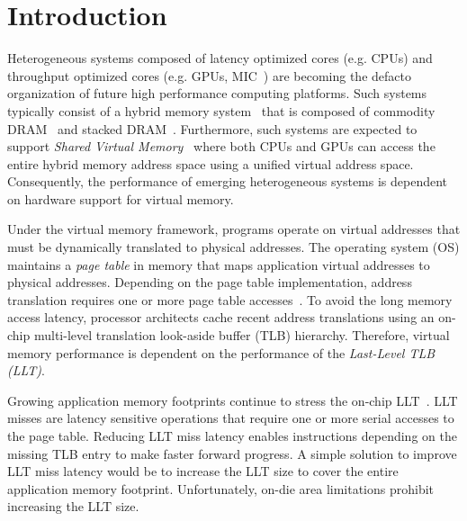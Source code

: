 
\section{Introduction}

\noindent Heterogeneous systems composed of latency
optimized cores (e.g. CPUs) and throughput optimized cores (e.g. GPUs,
MIC~\cite{MIC}) are becoming the defacto organization of future high
performance computing platforms. Such systems typically consist of a
hybrid memory system~\cite{hbm_intel,hbm_amd,hbm_nvidia} that is
composed of commodity DRAM~\cite{ddr4-spec} and stacked
DRAM~\cite{hbm-spec,hmc_spec}. Furthermore, such systems are expected
to support {\em Shared Virtual Memory}~\cite{HSA,UVM} where both CPUs
and GPUs can access the entire hybrid memory address space using a
unified virtual address space. Consequently, the performance of
emerging heterogeneous systems is dependent on hardware support for
virtual memory.%


Under the virtual memory framework, programs operate on virtual
addresses that must be dynamically translated to physical addresses.
The operating system (OS) maintains a {\em page table} in memory that
maps application virtual addresses to physical addresses. Depending on
the page table implementation, address translation requires one or
more page table accesses~\cite{Bhargava2008}. To avoid the long memory
access latency, processor architects cache recent address translations
using an on-chip multi-level translation look-aside buffer (TLB)
hierarchy. Therefore, virtual memory performance is dependent on the
performance of the {\em Last-Level TLB (LLT)}.

Growing application memory footprints continue to stress the on-chip
LLT~\cite{spectlb, Basu2013, SharedLLT, COLT}. LLT misses are latency
sensitive operations that require one or more serial accesses to the
page table. Reducing LLT miss latency enables instructions depending
on the missing TLB entry to make faster forward progress. A simple
solution to improve LLT miss latency would be to increase the LLT size
to cover the entire application memory footprint. Unfortunately,
on-die area limitations prohibit increasing the LLT size.


